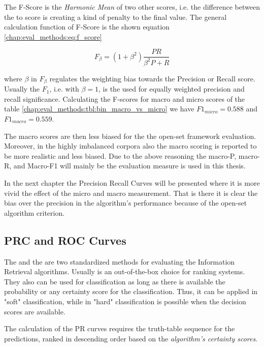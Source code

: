The F-Score is the \textit{Harmonic Mean} of two other scores, i.e. the difference between the to score is creating a kind of penalty to the final value. The general calculation function of F-Score is the shown equation \ref{chap:eval_methods:eq:f_score}

\begin{equation}\label{chap:eval_methods:eq:recall}
	F_{\beta} = (1 + \beta^{2}) \frac {P R} {\beta^{2} P + R}
\end{equation}

\noindent
where $\beta$ in $F_{\beta}$ regulates the weighting bias towards the Precision or Recall score. Usually the $F_{1}$, i.e. with $\beta = 1$, is the used for equally weighted precision and recall significance. Calculating the F-scores for macro and micro scores of the table \ref{chap:eval_methods:tbl:bin_macro_vs_micro} we have $F1_{micro} = 0.588$ and $F1_{macro} = 0.559$.

The macro scores are then less biased for the the open-set framework evaluation. Moreover, in the highly imbalanced corpora also the macro scoring is reported to be more realistic and less biased. Due to the above reasoning the macro-P, macro-R, and Macro-F1 will mainly be the evaluation measure is used in this thesis.

In the next chapter the Precision Recall Curves will be presented where it is more vivid the effect of the micro and macro measurement. That is there it is clear the bias over the precision in the algorithm's performance because of the open-set algorithm criterion.


\subsection{PRC and ROC Curves}\label{chap:eval_methods:sec:roc_prc}

The  and the  are two standardized methods for evaluating the Information Retrieval algorithms. Usually is an out-of-the-box choice for ranking systems. They also can be used for classification as long as there is available the probability or any certainty score for the classification. Thus, it can be applied in "soft" classification, while in "hard" classification is possible when the decision scores are available. 

The calculation of the PR curves requires the truth-table sequence for the predictions, ranked in descending order based on the \textit{algorithm's certainty scores}. 


